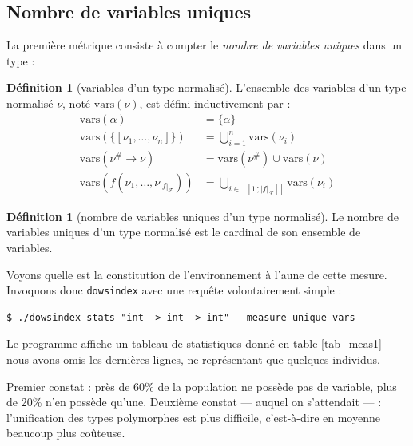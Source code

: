 \documentclass[a4paper]{report}
\theoremstyle{definition}
\newtheorem{definition}[theoreme]{Définition}
\newcommand{\dowsindex}{\texttt{dowsindex}\xspace}
\newcommand{\interval}[2]{[\![#1\,;#2]\!]}
\newcommand{\mset}[1]{\{\![#1]\!\}}
\newcommand{\F}{\mathscr{F}}
\begin{document}

\subsection{Nombre de variables uniques}

La première métrique consiste à compter le \emph{nombre de variables uniques} dans un type :

\begin{definition}[variables d'un type normalisé]
  L'ensemble des variables d'un type normalisé $\nu$, noté $\mathrm{vars} (\nu)$, est défini inductivement par :
  \begin{align*}
      \mathrm{vars} (\alpha) &=
      \{ \alpha \}
    \\
      \mathrm{vars} (\mset{\nu_1, \dots, \nu_n}) &=
      \bigcup _{i=1}^n \mathrm{vars} (\nu_i)
    \\
      \mathrm{vars} (\nu^\# \rightarrow \nu) &=
      \mathrm{vars} (\nu^\#) \cup \mathrm{vars} (\nu)
    \\
      \mathrm{vars} (f (\nu_1, \dots, \nu_{|f|_\F})) &=
      \bigcup_{i \in \interval 1 {|f|_\F}} \mathrm{vars} (\nu_i)
  \end{align*}
\end{definition}

\begin{definition}[nombre de variables uniques d'un type normalisé]
  Le nombre de variables uniques d'un type normalisé est le cardinal de son ensemble de variables.
\end{definition}

Voyons quelle est la constitution de l'environnement à l'aune de cette mesure. Invoquons donc \dowsindex avec une requête volontairement simple :

\begin{verbatim}
$ ./dowsindex stats "int -> int -> int" --measure unique-vars
\end{verbatim}

Le programme affiche un tableau de statistiques donné en table \ref{tab_meas1} — nous avons omis les dernières lignes, ne représentant que quelques individus.

Premier constat : près de 60\% de la population ne possède pas de variable, plus de 20\% n'en possède qu'une. Deuxième constat — auquel on s'attendait — : l'unification des types polymorphes est plus difficile, c'est-à-dire en moyenne beaucoup plus coûteuse.
\end{document}

